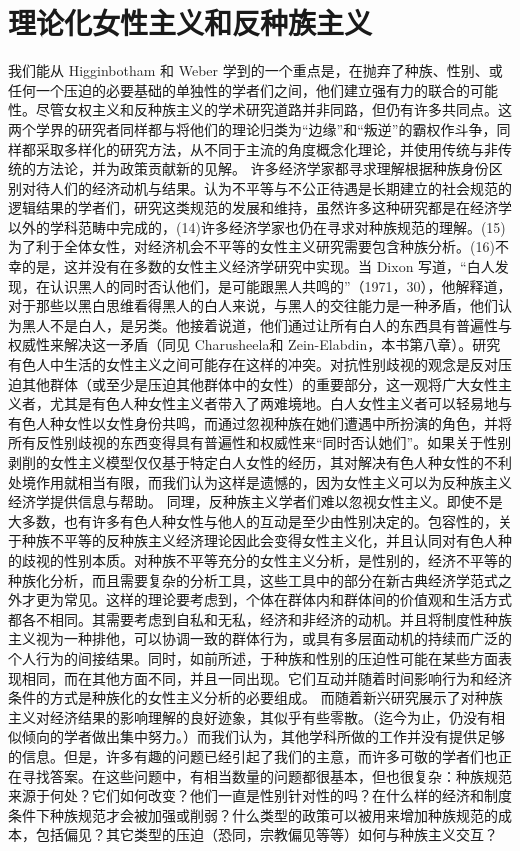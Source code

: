 \documentclass[UTF8]{ctexart}
\begin{document}
\section{理论化女性主义和反种族主义}我们能从 Higginbotham 和 Weber 学到的一个重点是，在抛弃了种族、性别、或任何一个压迫的必要基础的单独性的学者们之间，他们建立强有力的联合的可能性。尽管女权主义和反种族主义的学术研究道路并非同路，但仍有许多共同点。这两个学界的研究者同样都与将他们的理论归类为“边缘”和“叛逆”的霸权作斗争，同样都采取多样化的研究方法，从不同于主流的角度概念化理论，并使用传统与非传统的方法论，并为政策贡献新的见解。
许多经济学家都寻求理解根据种族身份区别对待人们的经济动机与结果。认为不平等与不公正待遇是长期建立的社会规范的逻辑结果的学者们，研究这类规范的发展和维持，虽然许多这种研究都是在经济学以外的学科范畴中完成的，(14)许多经济学家也仍在寻求对种族规范的理解。(15)
为了利于全体女性，对经济机会不平等的女性主义研究需要包含种族分析。(16)不幸的是，这并没有在多数的女性主义经济学研究中实现。当 Dixon 写道，“白人发现，在认识黑人的同时否认他们，是可能跟黑人共鸣的”（1971，30），他解释道，对于那些以黑白思维看得黑人的白人来说，与黑人的交往能力是一种矛盾，他们认为黑人不是白人，是另类。他接着说道，他们通过让所有白人的东西具有普遍性与权威性来解决这一矛盾（同见 Charusheela和 Zein-Elabdin，本书第八章）。研究有色人中生活的女性主义之间可能存在这样的冲突。对抗性别歧视的观念是反对压迫其他群体（或至少是压迫其他群体中的女性）的重要部分，这一观将广大女性主义者，尤其是有色人种女性主义者带入了两难境地。白人女性主义者可以轻易地与有色人种女性以女性身份共鸣，而通过忽视种族在她们遭遇中所扮演的角色，并将所有反性别歧视的东西变得具有普遍性和权威性来“同时否认她们”。如果关于性别剥削的女性主义模型仅仅基于特定白人女性的经历，其对解决有色人种女性的不利处境作用就相当有限，而我们认为这样是遗憾的，因为女性主义可以为反种族主义经济学提供信息与帮助。
同理，反种族主义学者们难以忽视女性主义。即使不是大多数，也有许多有色人种女性与他人的互动是至少由性别决定的。包容性的，关于种族不平等的反种族主义经济理论因此会变得女性主义化，并且认同对有色人种的歧视的性别本质。对种族不平等充分的女性主义分析，是性别的，经济不平等的种族化分析，而且需要复杂的分析工具，这些工具中的部分在新古典经济学范式之外才更为常见。这样的理论要考虑到，个体在群体内和群体间的价值观和生活方式都各不相同。其需要考虑到自私和无私，经济和非经济的动机。并且将制度性种族主义视为一种排他，可以协调一致的群体行为，或具有多层面动机的持续而广泛的个人行为的间接结果。同时，如前所述，于种族和性别的压迫性可能在某些方面表现相同，而在其他方面不同，并且一同出现。它们互动并随着时间影响行为和经济条件的方式是种族化的女性主义分析的必要组成。
而随着新兴研究展示了对种族主义对经济结果的影响理解的良好迹象，其似乎有些零散。（迄今为止，仍没有相似倾向的学者做出集中努力。）而我们认为，其他学科所做的工作并没有提供足够的信息。但是，许多有趣的问题已经引起了我们的主意，而许多可敬的学者们也正在寻找答案。在这些问题中，有相当数量的问题都很基本，但也很复杂：种族规范来源于何处？它们如何改变？他们一直是性别针对性的吗？在什么样的经济和制度条件下种族规范才会被加强或削弱？什么类型的政策可以被用来增加种族规范的成本，包括偏见？其它类型的压迫（恐同，宗教偏见等等）如何与种族主义交互？
\end{document}
